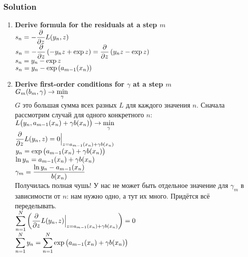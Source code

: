 \documentclass{article}
\newcommand{\block}[1]{\vspace{-1em}\begin{framed}#1\end{framed}\vspace{-\lastskip}\vspace{-.1cm}\hfill}
\newcommand{\red}[1]{{\color{red}{#1}}}
\newcommand{\TODO}{\texttt{\red{TODO}}}
\begin{document}
\subsubsection*{Solution}
\block{
  \begin{enumerate}
    \item \textbf{Derive formula for the residuals at a step $m$} \\
      $\displaystyle s_n = -\frac{\partial}{\partial z} L(y_n, z)$ \vspace{0.5em} \\
      $\displaystyle s_n = -\frac{\partial}{\partial z} \left( - y_n z + \exp{z} \right) = \frac{\partial}{\partial z} \left(y_n z - \exp{z}\right)$ \vspace{0.5em} \\
      $\displaystyle s_n = y_n - \exp{z}$ \vspace{0.5em} \\
      $\displaystyle s_n = y_n - \exp{\left(a_{m-1}(x_n)\right)}$

    \item \textbf{Derive first-order conditions for $\gamma$ at a step $m$} \\
      $\displaystyle G_m(b_m, \gamma) \to \min\limits_{\gamma}$ \vspace{0.5em} \\
      $G$ это большая сумма всех разных $L$ для каждого значения $n$.
      Сначала рассмотрим случай для одного конкретного $n$: \vspace{0.5em} \\
        $\displaystyle L\bigl(y_n, a_{m-1}(x_n) + \gamma b(x_n)\bigr) \to \min\limits_{\gamma}$ \vspace{0.5em} \\
        $\displaystyle \frac{\partial}{\partial z} L(y_n, z) = 0 \Big\vert_{z=a_{m-1}(x_n) + \gamma b(x_n)}$ \vspace{0.5em} \\
        $\displaystyle y_n = \exp{\bigl(a_{m-1}(x_n) + \gamma b(x_n)\bigr)}$ \vspace{0.5em} \\
        $\displaystyle \ln{y_n} = a_{m-1}(x_n) + \gamma b(x_n)$ \vspace{0.5em} \\
        $\displaystyle \gamma_m = \frac{\ln{y_n} - a_{m-1}(x_n)}{ b(x_n)}$ \vspace{0.5em} \\
      Получилась полная чушь!
      У нас не может быть отдельное значение для $\gamma_m$ в зависимости от $n$: нам нужно одно, а тут их много.
      Придётся всё переделывать. \vspace{0.5em} \\
      $\displaystyle \sum_{n=1}^N\left(\frac{\partial}{\partial z} L(y_n, z) \Big\vert_{z=a_{m-1}(x_n) + \gamma b(x_n)}\right) = 0$  \vspace{0.5em} \\
      $\displaystyle \sum_{n=1}^N y_n = \sum_{n=1}^N \exp{\bigl(a_{m-1}(x_n) + \gamma b(x_n)\bigr)}$  \vspace{0.5em} \\
      \TODO
  \end{enumerate}
}
\end{document}

